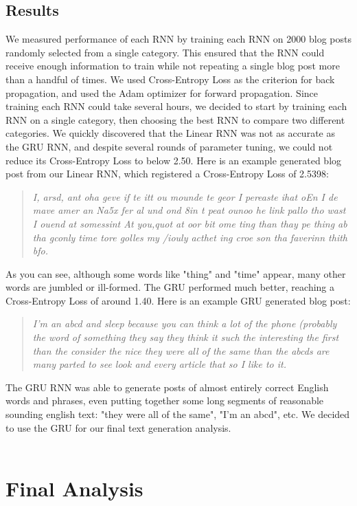 \documentclass{article}
\begin{document}
\subsection{Results}
We measured performance of each RNN by training each RNN on 2000 blog posts randomly selected from a single category. This ensured that the RNN could receive enough information to train while not repeating a single blog post more than a handful of times. We used Cross-Entropy Loss as the criterion for back propagation, and used the Adam optimizer for forward propagation. Since training each RNN could take several hours, we decided to start by training each RNN on a single category, then choosing the best RNN to compare two different categories. We quickly discovered that the Linear RNN was not as accurate as the GRU RNN, and despite several rounds of parameter tuning, we could not reduce its Cross-Entropy Loss to below 2.50. Here is an example generated blog post from our Linear RNN, which registered a Cross-Entropy Loss of 2.5398: 
\begin{quote} 
\centering 
\textit{I, arsd, ant oha geve if te itt ou mounde te geor I pereaste ihat oEn I de mave amer an Na5x 
fer al und ond 8in t peat ounoo he link pallo tho  wast I  ouend at somessint At you,quot at oor bit ome ting than thay pe thing ab tha gconly time tore golles my /iouly acthet ing croe son tha faverinn thith bfo. } 
\end{quote}
As you can see, although some words like "thing" and "time" appear, many other words are jumbled or ill-formed. The GRU performed much better, reaching a Cross-Entropy Loss of around 1.40. Here is an example GRU generated blog post:
 \begin{quote} 
\centering 
\textit{I'm an abcd and sleep because you can think a lot of the phone (probably the word of something they say they think it such the interesting the first than the consider the nice they were all of the same than the abcds are many parted to see look and every article that so I like to it. } 
\end{quote}
The GRU RNN was able to generate posts of almost entirely correct English words and phrases, even putting together some long segments of reasonable sounding english text: "they were all of the same", "I'm an abcd", etc. We decided to use the GRU for our final text generation analysis. \\ \\

\section{Final Analysis}
\end{document}
